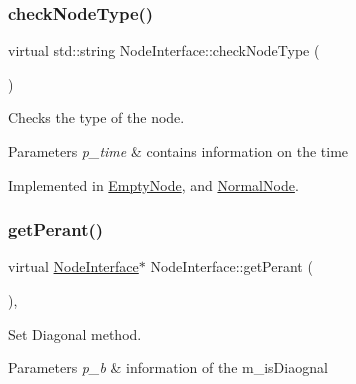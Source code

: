 \subsubsection{\texorpdfstring{check\+Node\+Type()}{checkNodeType()}}
{\footnotesize\ttfamily virtual std\+::string Node\+Interface\+::check\+Node\+Type (\begin{DoxyParamCaption}{ }\end{DoxyParamCaption})\hspace{0.3cm}{\ttfamily [pure virtual]}}



Checks the type of the node. 


\begin{DoxyParams}{Parameters}
{\em p\+\_\+time} & contains information on the time \\
\hline
\end{DoxyParams}


Implemented in \mbox{\hyperlink{class_empty_node_a2281f852354a5b95ba06f4e2a7e8de34}{Empty\+Node}}, and \mbox{\hyperlink{class_normal_node_aa11cbf32f7395ce3fd01113942c6351f}{Normal\+Node}}.

\mbox{\label{class_node_interface_ade5a090eeac6a245475f49589c79be8a}} 
\subsubsection{\texorpdfstring{get\+Perant()}{getPerant()}}
{\footnotesize\ttfamily virtual \mbox{\hyperlink{class_node_interface}{Node\+Interface}}$\ast$ Node\+Interface\+::get\+Perant (\begin{DoxyParamCaption}{ }\end{DoxyParamCaption})\hspace{0.3cm}{\ttfamily [inline]}, {\ttfamily [virtual]}}



Set Diagonal method. 


\begin{DoxyParams}{Parameters}
{\em p\+\_\+b} & information of the m\+\_\+is\+Diaognal \\
\hline
\end{DoxyParams}
\mbox{\label{class_node_interface_a4baa534fe0139637524fcd05cf9f5fe6}} 
